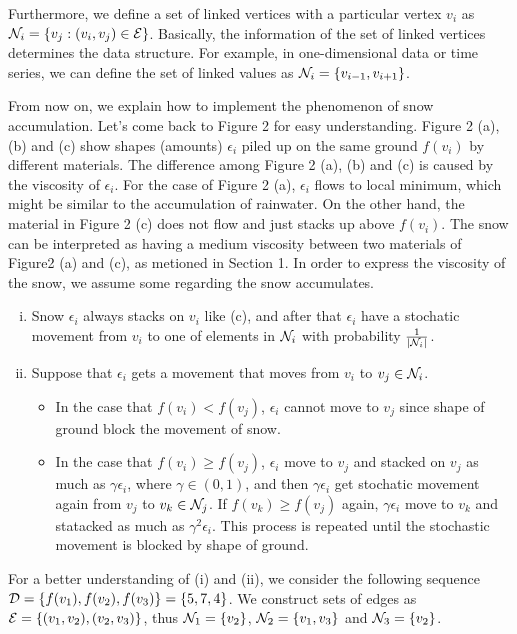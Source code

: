 \documentclass[preprint, review, 12pt]{article}
\theoremstyle{definition}
\theoremstyle{remark}
\begin{document}
Furthermore, we define a set of linked vertices with a particular vertex $v_i$ as ${\cal N}_i=\{v_j: (v_i,v_j) \in {\cal E} \}$. Basically, the information of the set of linked vertices determines the data structure. For example, in one-dimensional data or time series, we can define the set of linked values as ${\cal N}_i=\{v_{i-1},v_{i+1}\}$.  

From now on, we explain how to implement the phenomenon of snow accumulation. Let's come back to Figure 2 for easy understanding. Figure 2 (a), (b) and (c) show shapes (amounts) $\epsilon_i$ piled up on the same ground $f(v_i)$ by different materials. The difference among Figure 2 (a), (b) and (c) is caused by the viscosity of $\epsilon_i$. For the case of Figure 2 (a), $\epsilon_i$ flows to local minimum, which might be similar to the accumulation of rainwater. On the other hand, the material in Figure 2 (c) does not flow and just stacks up above $f(v_i)$. The snow can be interpreted as having a medium viscosity between two materials of Figure2 (a) and (c), as metioned in Section 1. In order to express the viscosity of the snow, we assume some regarding the snow accumulates. 
\begin{enumerate}[(i)]
\item Snow $\epsilon_i$ always stacks on $v_i$ like (c), and after that $\epsilon_i$ have a stochatic movement from $v_i$ to one of elements in ${\cal N}_i$ with probability $\frac{1}{|{\cal N}_i|}$. 
\item Suppose that $\epsilon_i$ gets a movement that moves from $v_i$ to $v_j \in {\cal N}_i$.
\begin{itemize}
\item In the case that $f(v_i)<f(v_j)$, $\epsilon_i$ cannot move to $v_j$ since shape of ground block the movement of snow. 
\item In the case that $f(v_i)\geq f(v_j)$, $\epsilon_i$ move to $v_j$ and stacked on $v_j$ as much as $\gamma \epsilon_i$, where $\gamma \in (0,1)$, and then $\gamma \epsilon_i$ get stochatic movement again from $v_j$ to $v_k\in{\cal N}_j$. If $f(v_k)\geq f(v_j)$ again, $\gamma \epsilon_i$ move to $v_k$ and statacked as much as $\gamma^2\epsilon_i$. This process is repeated until the stochastic movement is blocked by shape of ground.
\end{itemize} 
\end{enumerate}
\iffalse
For a better understanding of (i) and (ii), we consider the following sequence ${\cal D}=\{f(v_1),f(v_2),f(v_3)\}=\{5,7,4\}$. We construct sets of edges as ${\cal E}=\{(v_1,v_2),(v_2,v_3)\}$, thus ${\cal N}_1=\{v_2\}$, ${\cal N}_2=\{v_1,v_3\}$ and ${\cal N}_3=\{v_2\}$.
\end{document}
